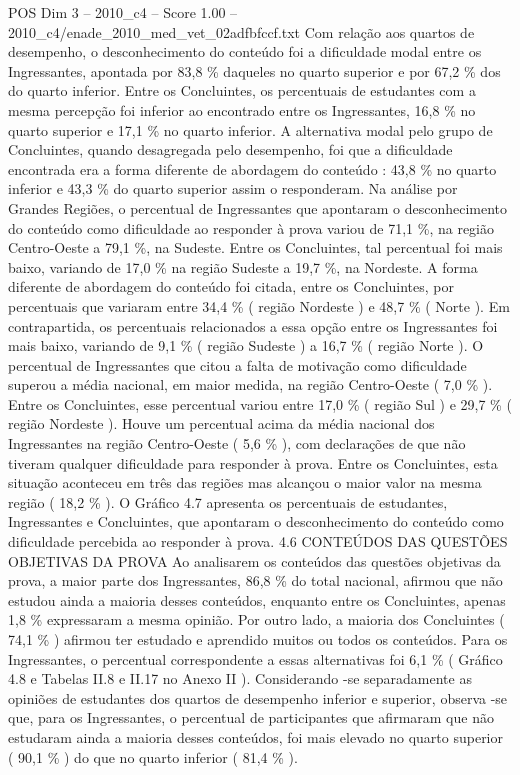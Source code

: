\begin{textsample}{POS Dim 3 – 2010\_c4 – Score 1.00 – 2010\_c4/enade\_2010\_med\_vet\_02adfbfccf.txt}
Com relação aos quartos de desempenho, o desconhecimento do conteúdo foi a dificuldade modal entre os Ingressantes, apontada por 83,8 \% daqueles no quarto superior e por 67,2 \% dos do quarto inferior.
Entre os Concluintes, os percentuais de estudantes com a mesma percepção foi inferior ao encontrado entre os Ingressantes, 16,8 \% no quarto superior e 17,1 \% no quarto inferior.
A alternativa modal pelo grupo de Concluintes, quando desagregada pelo desempenho, foi que a dificuldade encontrada era a forma diferente de abordagem do conteúdo : 43,8 \% no quarto inferior e 43,3 \% do quarto superior assim o responderam.
Na análise por Grandes Regiões, o percentual de Ingressantes que apontaram o desconhecimento do conteúdo como dificuldade ao responder à prova variou de 71,1 \%, na região Centro-Oeste a 79,1 \%, na Sudeste.
Entre os Concluintes, tal percentual foi mais baixo, variando de 17,0 \% na região Sudeste a 19,7 \%, na Nordeste.
A forma diferente de abordagem do conteúdo foi citada, entre os Concluintes, por percentuais que variaram entre 34,4 \% ( região Nordeste ) e 48,7 \% ( Norte ).
Em contrapartida, os percentuais relacionados a essa opção entre os Ingressantes foi mais baixo, variando de 9,1 \% ( região Sudeste ) a 16,7 \% ( região Norte ).
O percentual de Ingressantes que citou a falta de motivação como dificuldade superou a média nacional, em maior medida, na região Centro-Oeste ( 7,0 \% ).
Entre os Concluintes, esse percentual variou entre 17,0 \% ( região Sul ) e 29,7 \% ( região Nordeste ).
Houve um percentual acima da média nacional dos Ingressantes na região Centro-Oeste ( 5,6 \% ), com declarações de que não tiveram qualquer dificuldade para responder à prova.
Entre os Concluintes, esta situação aconteceu em três das regiões mas alcançou o maior valor na mesma região ( 18,2 \% ).
O Gráfico 4.7 apresenta os percentuais de estudantes, Ingressantes e Concluintes, que apontaram o desconhecimento do conteúdo como dificuldade percebida ao responder à prova. 4.6 CONTEÚDOS DAS QUESTÕES OBJETIVAS DA PROVA Ao analisarem os conteúdos das questões objetivas da prova, a maior parte dos Ingressantes, 86,8 \% do total nacional, afirmou que não estudou ainda a maioria desses conteúdos, enquanto entre os Concluintes, apenas 1,8 \% expressaram a mesma opinião.
Por outro lado, a maioria dos Concluintes ( 74,1 \% ) afirmou ter estudado e aprendido muitos ou todos os conteúdos.
Para os Ingressantes, o percentual correspondente a essas alternativas foi 6,1 \% ( Gráfico 4.8 e Tabelas II.8 e II.17 no Anexo II ).
Considerando -se separadamente as opiniões de estudantes dos quartos de desempenho inferior e superior, observa -se que, para os Ingressantes, o percentual de participantes que afirmaram que não estudaram ainda a maioria desses conteúdos, foi mais elevado no quarto superior ( 90,1 \% ) do que no quarto inferior ( 81,4 \% ).

\end{textsample}
